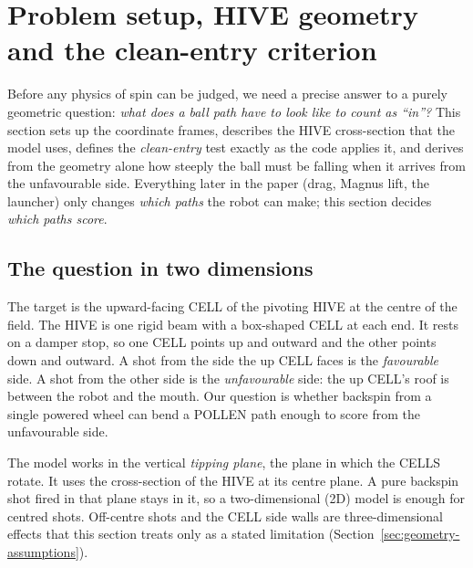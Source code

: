 \section{Problem setup, HIVE geometry and the clean-entry criterion}
\label{sec:geometry}


Before any physics of spin can be judged, we need a precise answer to a purely geometric
question: \emph{what does a ball path have to look like to count as ``in''?} This section sets up
the coordinate frames, describes the HIVE cross-section that the model uses, defines the
\emph{clean-entry} test exactly as the code applies it, and derives from the geometry alone how
steeply the ball must be falling when it arrives from the unfavourable side. Everything later in
the paper (drag, Magnus lift, the launcher) only changes \emph{which paths} the robot can make;
this section decides \emph{which paths score}.

\subsection{The question in two dimensions}
\label{sec:geometry-question}

The target is the upward-facing CELL of the pivoting HIVE at the centre of the field. The HIVE is
one rigid beam with a box-shaped CELL at each end. It rests on a damper stop, so one CELL points up
and outward and the other points down and outward. A shot from the side the up CELL faces is
the \emph{favourable} side. A shot from the other side is the \emph{unfavourable} side: the up CELL's
roof is between the robot and the mouth. Our question is whether backspin from a single powered
wheel can bend a POLLEN path enough to score from the unfavourable side.

The model works in the vertical \emph{tipping plane}, the plane in which the CELLS rotate. It
uses the cross-section of the HIVE at its centre plane. A pure backspin shot fired in that plane
stays in it, so a two-dimensional (2D) model is enough for centred shots. Off-centre shots and the
CELL side walls are three-dimensional effects that this section treats only as a stated
limitation (Section~\ref{sec:geometry-assumptions}).

